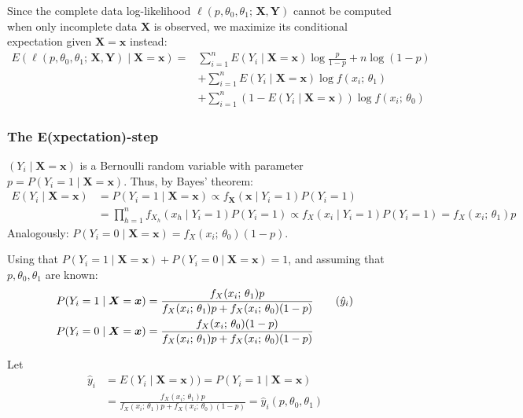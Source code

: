 Since the complete data log-likelihood $\ell(p,\theta_0,\theta_1;\,\boldsymbol{X},\boldsymbol{Y})$
cannot be computed when only incomplete
data $\boldsymbol{X}$ is observed, we maximize its conditional expectation given
$\boldsymbol{X} = \boldsymbol{x}$ instead:
\begin{align*}
	E \left(\ell(p,\theta_0,\theta_1;\,\boldsymbol{X},\boldsymbol{Y}) \mid \boldsymbol{X}=\boldsymbol{x} \right)
	= & \sum_{i=1}^n E(Y_i \mid \boldsymbol{X}=\boldsymbol{x}) \log \frac{p}{1-p} + n \log (1 - p) \\
	  & + \sum_{i=1}^n E(Y_i \mid \boldsymbol{X}=\boldsymbol{x}) \log f(x_i;\,\theta_1)            \\
	  & + \sum_{i=1}^n (1 - E(Y_i \mid \boldsymbol{X}=\boldsymbol{x})) \log f(x_i;\,\theta_0)
\end{align*}

\subsubsection{The E(xpectation)-step}
$(Y_i \mid \boldsymbol{X}=\boldsymbol{x})$ is a Bernoulli random variable with parameter
$p = P(Y_i = 1 \mid \boldsymbol{X}=\boldsymbol{x})$. Thus, by Bayes' theorem:
\begin{align*}
    E(Y_i \mid \boldsymbol{X}=\boldsymbol{x}) & = P(Y_i = 1 \mid \boldsymbol{X}=\boldsymbol{x})
    \propto f_{\boldsymbol{X}}(\boldsymbol{x} \mid Y_i = 1) P(Y_i = 1) \\
                                              &= \prod_{h=1}^n f_{X_h}(x_h \mid Y_i = 1) P(Y_i = 1)
                                              \propto f_X(x_i \mid Y_i = 1) P(Y_i = 1) = f_X(x_i;\,\theta_1) p
\end{align*}
Analogously: $P(Y_i = 0 \mid \boldsymbol{X}=\boldsymbol{x}) = f_X(x_i;\,\theta_0) (1-p)$.

Using that $P(Y_i = 1 \mid \boldsymbol{X}=\boldsymbol{x}) + P(Y_i = 0 \mid \boldsymbol{X}=\boldsymbol{x}) = 1$,
and assuming that $p, \theta_0, \theta_1$ are known:
\begin{align*}
    P(Y_i = 1 \mid \boldsymbol{X}=\boldsymbol{x}) & = \frac{f_X(x_i;\,\theta_1) p}{f_X(x_i;\,\theta_1) p + f_X(x_i;\,\theta_0) (1-p)} \tag{$\hat{y}_i$}\\
    P(Y_i = 0 \mid \boldsymbol{X}=\boldsymbol{x}) & = \frac{f_X(x_i;\,\theta_0) (1-p)}{f_X(x_i;\,\theta_1) p + f_X(x_i;\,\theta_0) (1-p)}
\end{align*}

Let
\begin{align*}
    \hat{y}_i & = E(Y_i \mid \boldsymbol{X}=\boldsymbol{x}) ) =
    P(Y_i = 1 \mid \boldsymbol{X}=\boldsymbol{x}) \\
              &= \frac{f_X(x_i;\,\theta_1) p}{f_X(x_i;\,\theta_1) p + f_X(x_i;\,\theta_0) (1-p)}
              = \hat{y}_i(p,\theta_0,\theta_1)
\end{align*}

